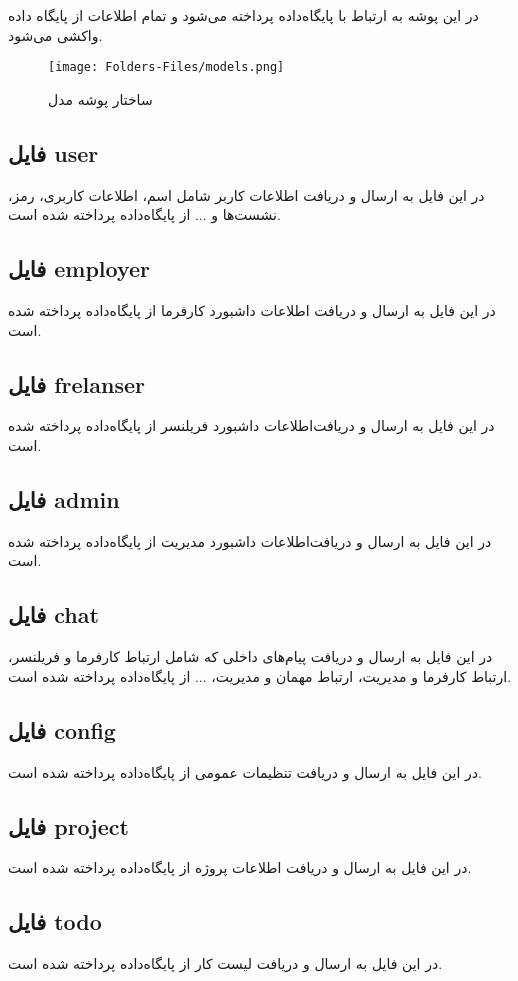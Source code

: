 در این پوشه به ارتباط با پایگاه‌داده پرداخته می‌شود و تمام اطلاعات از پایگاه داده واکشی می‌شود.

\begin{figure}[H]
	\texttt{[image: Folders-Files/models.png]}
	\centering
	\caption{ساختار پوشه مدل}
	\label{fig:folder-models}
\end{figure}

\subsection{فایل user}
در این فایل به ارسال و دریافت اطلاعات کاربر شامل اسم، اطلاعات کاربری، رمز، نشست‌ها و ... از پایگاه‌داده پرداخته شده است.

\subsection{فایل employer}
در این فایل به ارسال و دریافت اطلاعات داشبورد کارفرما از پایگاه‌داده پرداخته شده است.

\subsection{فایل frelanser}
در این فایل به ارسال و دریافت‌اطلاعات داشبورد فریلنسر از پایگاه‌داده پرداخته شده است.

\subsection{فایل admin}
در این فایل به ارسال و دریافت‌اطلاعات داشبورد مدیریت از پایگاه‌داده پرداخته شده است.

\subsection{فایل chat}
در این فایل به ارسال و دریافت پیام‌های ‌داخلی که شامل ارتباط کارفرما و فریلنسر، ارتباط کارفرما و مدیریت، ارتباط مهمان و مدیریت، ... از پایگاه‌داده پرداخته شده است.

\subsection{فایل config}
در این فایل به ارسال و دریافت تنظیمات عمومی از پایگاه‌داده پرداخته شده است.

\subsection{فایل project}
در این فایل به ارسال و دریافت اطلاعات پروژه از پایگاه‌داده پرداخته شده است.

\subsection{فایل todo}
در این فایل به ارسال و دریافت لیست کار از پایگاه‌داده پرداخته شده است.

